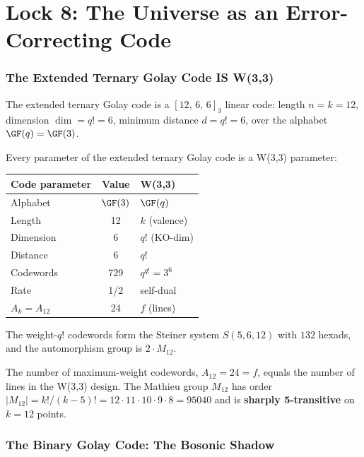 \clearpage
\part{Lock 8: The Universe as an Error-Correcting Code}

\section{The Extended Ternary Golay Code IS W(3,3)}
\label{sec:ternary-golay}

The extended ternary Golay code is a $[12,\,6,\,6]_3$ linear code:
length $n=k=12$, dimension $\dim = q! = 6$, minimum distance $d = q! = 6$,
over the alphabet $\GF(q) = \GF(3)$.

\begin{theorem}
\label{thm:lock8}
Every parameter of the extended ternary Golay code is a
W(3,3) parameter:
\begin{center}
\begin{tabular}{@{}lcl@{}}
\toprule
Code parameter & Value & W(3,3) \\
\midrule
Alphabet & $\GF(3)$ & $\GF(q)$ \\
Length & 12 & $k$ (valence) \\
Dimension & 6 & $q!$ (KO-dim) \\
Distance & 6 & $q!$ \\
Codewords & 729 & $q^{q!} = 3^6$ \\
Rate & 1/2 & self-dual \\
$A_k = A_{12}$ & 24 & $f$ (lines) \\
\bottomrule
\end{tabular}
\end{center}
The weight-$q!$ codewords form the Steiner system $S(5,6,12)$
with $132$ hexads, and the automorphism group is $2\cdot M_{12}$.
\end{theorem}

The number of maximum-weight codewords, $A_{12} = 24 = f$,
equals the number of lines in the W(3,3) design.
The Mathieu group $M_{12}$ has order
$|M_{12}| = k!/(k{-}5)! = 12\cdot 11\cdot 10\cdot 9\cdot 8 = 95040$
and is \textbf{sharply 5-transitive} on $k=12$ points.


\section{The Binary Golay Code: The Bosonic Shadow}
\label{sec:binary-golay}

